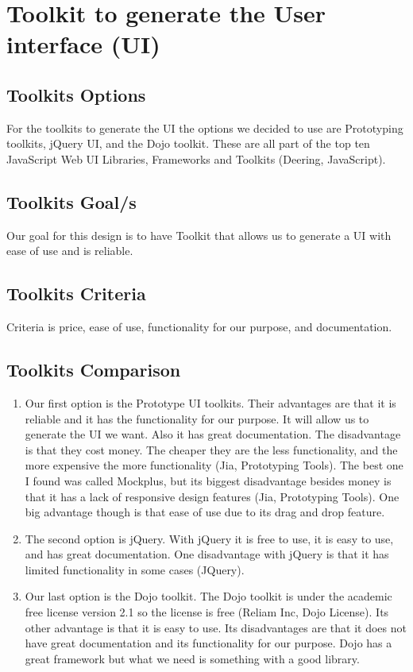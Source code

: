 \documentclass[10pt,draftclsnofoot,onecolumn]{IEEEtran}
\begin{document}
        \section{  Toolkit to generate the User interface (UI)}
\subsection{Toolkits Options}
 For the toolkits to generate the UI the options we decided to use are Prototyping toolkits, jQuery UI, and the Dojo toolkit.  These are all part of the top ten JavaScript Web UI Libraries, Frameworks and Toolkits (Deering, JavaScript).  

 \subsection{Toolkits Goal/s}
  Our goal for this design is to have Toolkit that allows us to generate a UI with ease of use and is reliable.
  \subsection{Toolkits Criteria}
   Criteria is price, ease of use, functionality for our purpose, and documentation.
   \subsection{Toolkits Comparison}
   \begin{enumerate}
   \item
    Our first option is the Prototype UI toolkits.  Their advantages are that it is reliable and it has the functionality for our purpose.  It will allow us to generate the UI we want.  Also it has great documentation.  The disadvantage is that they cost money.  The cheaper they are the less functionality, and the more expensive the more functionality (Jia, Prototyping Tools).  The best one I found was called Mockplus, but its biggest disadvantage besides money is that it has a lack of responsive design features (Jia, Prototyping Tools).  One big advantage though is that ease of use due to its drag and drop feature.\\
   \item
    The second option is jQuery.  With jQuery it is free to use, it is easy to use, and has great documentation.  One disadvantage with jQuery is that it has limited functionality in some cases (JQuery).\\
   \item
    Our last option is the Dojo toolkit.  The Dojo toolkit is under the academic free license version 2.1 so the license is free (Reliam Inc, Dojo License).   Its other advantage is that it is easy to use.  Its disadvantages are that it does not have great documentation and its functionality for our purpose.  Dojo has a great framework but what we need is something with a good library.
   \end {enumerate}
\end{document}
